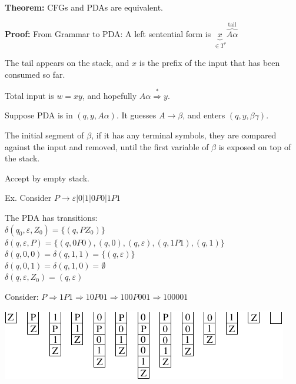 \begin{frame}

{\bf Theorem:} CFGs and PDAs are equivalent.

{\bf Proof:} From Grammar to PDA:
A left sentential form is $\underbrace{x}_{\in T^*}
\overbrace{A\alpha}^{\text{tail}}$

The tail appears on the stack, and $x$ is the prefix of the input that
has been consumed so far.

Total input is $w=xy$, and hopefully
$A\alpha\stackrel{*}{\Rightarrow}y$.

Suppose PDA is in $(q,y,A\alpha)$.  It guesses
$A\longrightarrow\beta$, and enters $(q,y,\beta\gamma)$.

The initial segment of $\beta$, if it has any terminal symbols, they
are compared against the input and removed, until the first variable
of $\beta$ is exposed on top of the stack.

Accept by empty stack.
\end{frame}

\begin{frame}
Ex.  Consider $P\longrightarrow \varepsilon|0|1|0P0|1P1$

The PDA has transitions: \\
$\delta(q_0,\varepsilon,Z_0)=\{(q,PZ_0)\}$ \\
$\delta(q,\varepsilon,P)=\{(q,0P0),(q,0),(q,\varepsilon),(q,1P1),(q,1)\}$\\
$\delta(q,0,0)=\delta(q,1,1)=\{(q,\varepsilon)\}$ \\
$\delta(q,0,1)=\delta(q,1,0)=\emptyset$ \\
$\delta(q,\varepsilon,Z_0)=(q,\varepsilon)$

Consider:
$P\Rightarrow 1P1
\Rightarrow 10P01
\Rightarrow 100P001
\Rightarrow 100001$

\bigskip

\includegraphics{figures/9.pdf}
\end{frame}

